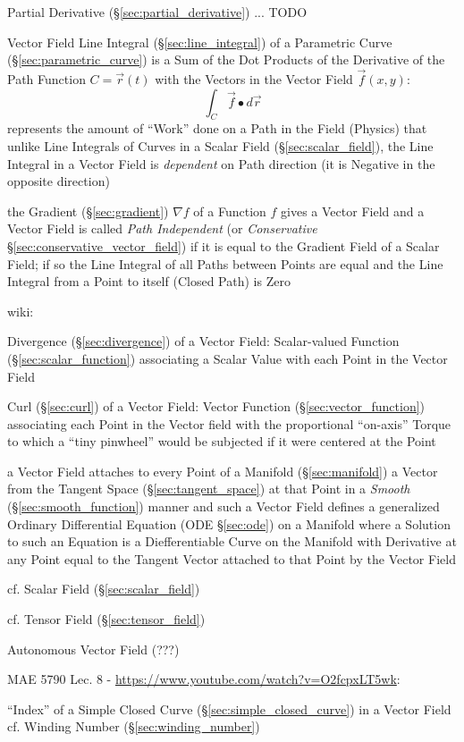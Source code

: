 Partial Derivative (\S\ref{sec:partial_derivative}) ... TODO

Vector Field Line Integral (\S\ref{sec:line_integral}) of a Parametric Curve
(\S\ref{sec:parametric_curve}) is a Sum of the Dot Products of the Derivative
of the Path Function $C = \vec{r}(t)$ with the Vectors in the Vector Field
$\vec{f}(x,y)$:
\[
  \int_C \vec{f} \bullet d\vec{r}
\]
represents the amount of ``Work'' done on a Path in the Field (Physics)
that unlike Line Integrals of Curves in a Scalar Field
(\S\ref{sec:scalar_field}), the Line Integral in a Vector Field is
\emph{dependent} on Path direction (it is Negative in the opposite direction)

the Gradient (\S\ref{sec:gradient}) $\nabla f$ of a Function $f$ gives a Vector
Field and a Vector Field is called \emph{Path Independent} (or
\emph{Conservative} \S\ref{sec:conservative_vector_field}) if it is equal to
the Gradient Field of a Scalar Field; if so the Line Integral of all Paths
between Points are equal and the Line Integral from a Point to itself (Closed
Path) is Zero

wiki:

Divergence (\S\ref{sec:divergence}) of a Vector Field: Scalar-valued Function
(\S\ref{sec:scalar_function}) associating a Scalar Value with each Point in
the Vector Field

Curl (\S\ref{sec:curl}) of a Vector Field: Vector Function
(\S\ref{sec:vector_function}) associating each Point in the Vector field with
the proportional ``on-axis'' Torque to which a ``tiny pinwheel'' would be
subjected if it were centered at the Point

a Vector Field attaches to every Point of a Manifold (\S\ref{sec:manifold}) a
Vector from the Tangent Space (\S\ref{sec:tangent_space}) at that Point in a
\emph{Smooth} (\S\ref{sec:smooth_function}) manner and such a Vector Field
defines a generalized Ordinary Differential Equation (ODE \S\ref{sec:ode}) on a
Manifold where a Solution to such an Equation is a Diefferentiable Curve on the
Manifold with Derivative at any Point equal to the Tangent Vector attached to
that Point by the Vector Field

cf. Scalar Field (\S\ref{sec:scalar_field})

cf. Tensor Field (\S\ref{sec:tensor_field})

Autonomous Vector Field (???)


MAE 5790 Lec. 8 - \url{https://www.youtube.com/watch?v=O2fcpxLT5wk}:

``Index'' of a Simple Closed Curve (\S\ref{sec:simple_closed_curve}) in a
Vector Field \fist cf. Winding Number (\S\ref{sec:winding_number})



